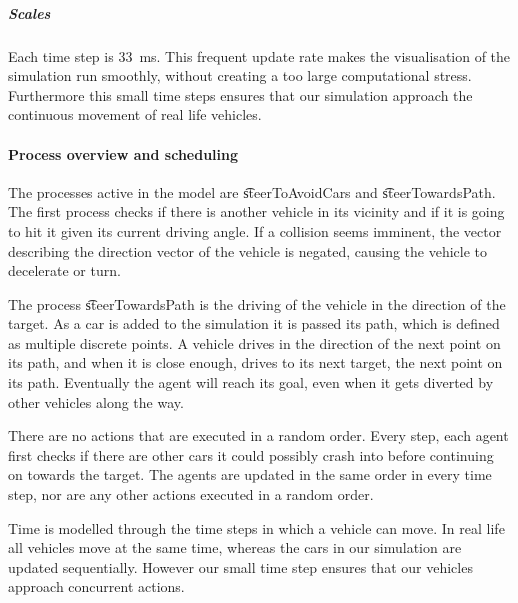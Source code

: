 	\subparagraph{Scales}
	Each time step is \si{33 \milli\second}. This frequent update rate makes the visualisation of the simulation run smoothly, without creating a too large computational stress. Furthermore this small time steps ensures that our simulation approach the continuous movement of real life vehicles.





\paragraph{Process overview and scheduling}
\label{par:method:model:overview:process}


The processes active in the model are \t{steerToAvoidCars} and \t{steerTowardsPath}. The first process checks if there is another vehicle in its vicinity and if it is going to hit it given its current driving angle. If a collision seems imminent, the vector describing the direction vector of the vehicle is negated, causing the vehicle to decelerate or turn.

The process \t{steerTowardsPath} is the driving of the vehicle in the direction of the target. As a car is added to the simulation it is passed its path, which is defined as multiple discrete points.  A vehicle drives in the direction of the next point on its path, and when it is close enough, drives to its next target, the next point on its path. Eventually the agent will reach its goal, even when it gets diverted by other vehicles along the way.

There are no actions that are executed in a random order.
Every step, each agent first checks if there are other cars it could possibly crash into before continuing on towards the target. The agents are updated in the same order in every time step, nor are any other actions executed in a random order.

Time is modelled through the time steps in which a vehicle can move. In real life all vehicles move at the same time, whereas the cars in our simulation are updated sequentially. However our small time step ensures that our vehicles approach concurrent actions. 


